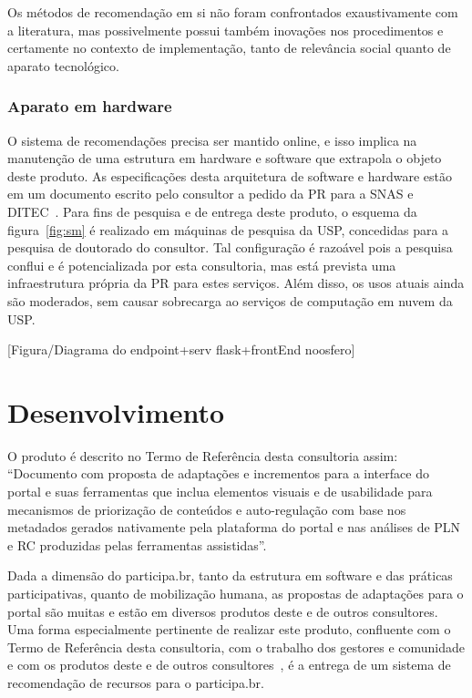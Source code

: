 \documentclass[12pt]{article}
\begin{document}
Os métodos de recomendação em si não foram confrontados exaustivamente com a literatura, mas possivelmente possui também inovações nos procedimentos e certamente no contexto de implementação, tanto de relevância social quanto de aparato tecnológico.

\subsubsection{Aparato em hardware}

O sistema de recomendações precisa ser mantido online, e isso implica na manutenção de uma estrutura em hardware e software que extrapola o objeto deste produto. As especificações desta arquitetura de software e hardware estão em um documento escrito pelo consultor a pedido da PR para a SNAS e DITEC~\cite{smDITEC}. Para fins de pesquisa e de entrega deste produto, o esquema da figura~\ref{fig:sm} é realizado em máquinas de pesquisa da USP, concedidas para a pesquisa de doutorado do consultor. Tal configuração é razoável pois a pesquisa conflui e é potencializada por esta consultoria, mas está prevista uma infraestrutura própria da PR para estes serviços. Além disso, os usos atuais ainda são moderados, sem causar sobrecarga ao serviços de computação em nuvem da USP.

[Figura/Diagrama do endpoint+serv flask+frontEnd noosfero]

\section{Desenvolvimento}
O produto é descrito no Termo de Referência desta consultoria assim: ``Documento com proposta de adaptações e incrementos para a interface do portal e suas ferramentas que inclua elementos visuais e de usabilidade para mecanismos de priorização de conteúdos e auto-regulação com base nos metadados gerados nativamente pela plataforma do portal e nas análises de PLN e RC produzidas pelas ferramentas assistidas''.

Dada a dimensão do participa.br, tanto da estrutura em software e das práticas participativas, quanto de mobilização humana, as propostas de adaptações para o portal são muitas e estão em diversos produtos deste e de outros consultores. Uma forma especialmente pertinente de realizar este produto, confluente com o Termo de Referência desta consultoria, com o trabalho dos gestores e comunidade e com os produtos deste e de outros consultores~\cite{prodExtra}, é a entrega de um sistema de recomendação de recursos para o participa.br.
\end{document}
